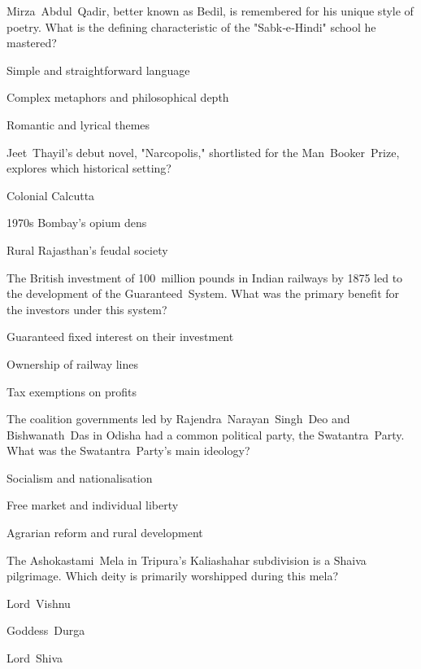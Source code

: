 \begin{enhancedmcq}{Mirza Abdul Qadir, better known as Bedil, is remembered for his unique style of poetry. What is the defining characteristic of the "Sabk‑e‑Hindi" school he mastered?}
\item Simple and straightforward language
\item Complex metaphors and philosophical depth
\item Romantic and lyrical themes

\end{enhancedmcq}
\begin{enhancedmcq}{Jeet Thayil's debut novel, "Narcopolis," shortlisted for the Man Booker Prize, explores which historical setting?}
\item Colonial Calcutta
\item 1970s Bombay's opium dens
\item Rural Rajasthan's feudal society

\end{enhancedmcq}
\begin{enhancedmcq}{The British investment of 100 million pounds in Indian railways by 1875 led to the development of the Guaranteed System. What was the primary benefit for the investors under this system?}
\item Guaranteed fixed interest on their investment
\item Ownership of railway lines
\item Tax exemptions on profits

\end{enhancedmcq}
\begin{enhancedmcq}{The coalition governments led by Rajendra Narayan Singh Deo and Bishwanath Das in Odisha had a common political party, the Swatantra Party. What was the Swatantra Party's main ideology?}
\item Socialism and nationalisation
\item Free market and individual liberty
\item Agrarian reform and rural development

\end{enhancedmcq}
\begin{enhancedmcq}{The Ashokastami Mela in Tripura's Kaliashahar subdivision is a Shaiva pilgrimage. Which deity is primarily worshipped during this mela?}
\item Lord Vishnu
\item Goddess Durga
\item Lord Shiva

\end{enhancedmcq}

